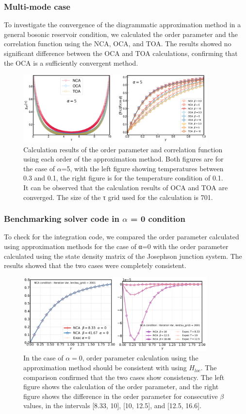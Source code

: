 \documentclass{article}[12pt]
\begin{document}
\begin{spacing}{1.5}
\subsubsection*{Multi-mode case}
To investigate the convergence of the diagrammatic approximation method in a general bosonic reservoir condition, 
we calculated the order parameter and the correlation function using the NCA, OCA, and TOA. 
The results showed no significant difference between the OCA and TOA calculations, confirming that the OCA is a sufficiently convergent method.
\begin{figure}[htbp]
  \centerline{\includegraphics[width=10cm]{TexFigure/Multi_bench.png}}
  \caption{ Calculation results of the order parameter and correlation function using each order of the approximation method. 
  Both figures are for the case of $\alpha$=5, with the left figure showing temperatures between 0.3 and 0.1, 
  the right figure is for the temperature condition of 0.1. It can be observed that the calculation results of OCA and TOA are converged. 
  The size of the τ grid used for the calculation is 701.}
\end{figure}
\subsubsection*{Benchmarking solver code in $\alpha$ = 0 condition}
To check for the integration code, we compared the order parameter calculated using approximation methods for the case of α=0 
with the order parameter calculated using the state density matrix of the Josephson junction system. 
The results showed that the two cases were completely consistent.
\begin{figure}[htbp]
  \centerline{\includegraphics[width=10cm]{TexFigure/Dens_comp.png}}
  \caption{In the case of $\alpha = 0$, order parameter calculation using the approximation method should be consistent with using $H_{loc}$.
  The comparison confirmed that the two cases show consistency. The left figure shows the calculation of the order parameter, 
  and the right figure shows the difference in the order parameter for consecutive $\beta$ values,
   in the intervals [8.33, 10], [10, 12.5], and [12.5, 16.6].}
\end{figure}

\end{spacing}
\end{document}

